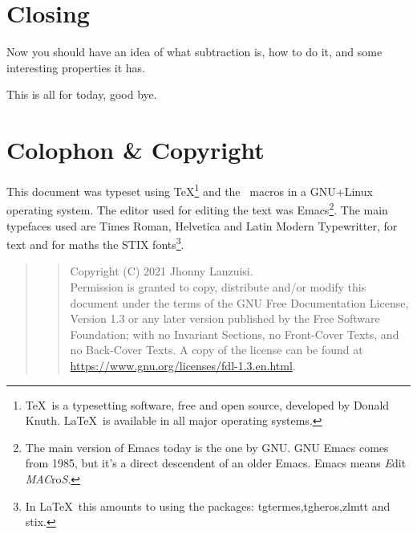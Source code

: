 \documentclass{scrartcl}
\let\oldtoc\tableofcontents
\renewcommand{\tableofcontents}{{\renewcommand{\sffamily}{\rmfamily}\oldtoc}}
\newcommand{\icode}[1]{\textsf{#1}}
\begin{document}
\section{Closing}
\label{sec:close}

Now you should have an idea of what subtraction is,
how to do it,
and some interesting properties it has.

This is all for today, good bye.
\newpage
\section*{Colophon \& Copyright}
This document was typeset using \TeX\footnote{\TeX\ is
a typesetting software, free and open source,
developed by Donald Knuth. \LaTeX\ is available in
all major operating systems.}
and the \LaTeXe\ macros in a GNU+Li\-nux operating system.
The editor used for editing the text was Emacs\footnote{The main version
of Emacs today is the one by GNU. GNU Emacs comes from 1985,
but it's a direct descendent of an older Emacs.
Emacs means \textit{E}dit \textit{MAC}ro\textit{S}.}.
The main typefaces used are Times Roman,
Helvetica and Latin Modern Typewritter, for text and for maths
the STIX fonts\footnote{In \LaTeX\ this amounts to using the packages:
\icode{tgtermes},\icode{tgheros},\icode{zlmtt} and \icode{stix}.}.
\medskip
\begin{quote}\footnotesize
  \begin{quote}
  Copyright (C)  2021 Jhonny Lanzuisi.\\
  Permission is granted to copy, distribute and/or modify this document
  under the terms of the GNU Free Documentation License, Version 1.3
  or any later version published by the Free Software Foundation;
  with no Invariant Sections, no Front-Cover Texts, and no Back-Cover Texts.
  A copy of the license can be found at\\
  \url{https://www.gnu.org/licenses/fdl-1.3.en.html}.\par
  \end{quote}
\end{quote}
\newpage
\tableofcontents
\end{document}
